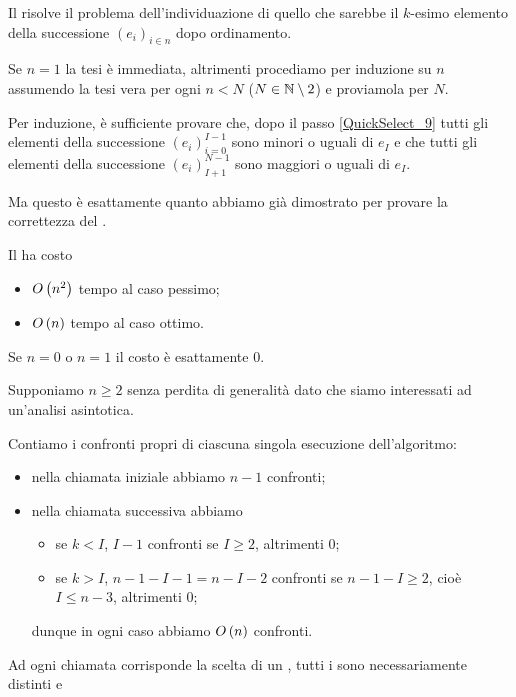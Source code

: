 \begin{Theorem}
  Il  risolve il problema dell'individuazione di quello
  che sarebbe il $k$-esimo elemento della successione $(e_i)_{i \in n}$ dopo
  ordinamento.
\end{Theorem}
\Proof Se $n = 1$ la tesi \`e immediata, altrimenti procediamo
per induzione su $n$ assumendo la tesi vera per ogni $n < N$
($N \in \mathbb{N} \setminus 2$) e proviamola per $N$.
\par Per induzione, \`e sufficiente provare che, dopo il passo
\ref{QuickSelect_9} tutti gli elementi della successione
$(e_i)_{i = 0}^{I - 1}$
sono minori o uguali di $e_I$ e che tutti gli elementi della successione
$(e_i)_{I + 1}^{N - 1}$
sono maggiori o uguali di $e_I$.
\par Ma questo \`e esattamente quanto abbiamo gi\`a dimostrato per provare
la correttezza del . \EndProof
\begin{Theorem}
  Il  ha costo
  \begin{itemize}
    \item $O \left ( n^2 \right )$ tempo al caso pessimo;
    \item $O \left ( n \right )$ tempo al caso ottimo.
  \end{itemize}
\end{Theorem}
\Proof Se $n = 0$ o $n = 1$ il costo \`e esattamente $0$.
\par Supponiamo $n \geq 2$ senza perdita di generalit\`a dato che
siamo interessati ad un'analisi asintotica.
\par Contiamo i confronti propri di ciascuna singola esecuzione dell'algoritmo:
\begin{itemize}
  \item nella chiamata iniziale abbiamo $n - 1$ confronti;
  \item nella chiamata successiva abbiamo
      \begin{itemize}
        \item se $k < I$, $I - 1$ confronti se $I \geq 2$, altrimenti $0$;
        \item se $k > I$, $n - 1 - I - 1 = n - I - 2$ confronti se
          $n - 1 - I \geq 2$, cio\`e $I \leq n - 3$, altrimenti $0$;
      \end{itemize}
      dunque in ogni caso abbiamo $O \left ( n \right )$ confronti.
\end{itemize}
\par Ad ogni chiamata corrisponde la scelta di un ,
tutti i  sono necessariamente distinti e
